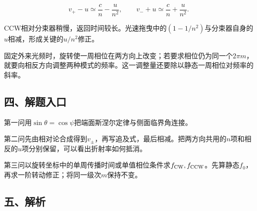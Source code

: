 \documentclass[12pt,a4paper,fontset=fandol]{ctexart}
\begin{document}
\[
v_+-u\simeq\frac cn-\frac{u}{n^2},
\qquad
v_-+u\simeq\frac cn+\frac{u}{n^2}.
\]

CCW相对分束器稍慢，返回时间较长。光速拖曳中的\((1-1/n^2)\)与分束器自身的\(u\)相减，形成关键的\(u/n^2\)修正。

\begin{center}
\begin{minipage}{\linewidth}
\centering\begingroup{}
\ifdim\wd\diagrambox>.88\linewidth
\sbox{\diagrambox}{\resizebox{.88\linewidth}{!}{\usebox{\diagrambox}}}\fi
\ifdim\ht\diagrambox>.38\textheight
\resizebox{!}{.38\textheight}{\usebox{\diagrambox}}
\else\usebox{\diagrambox}\fi
\par{}\endgroup\end{minipage}\end{center}

固定外来光频时，旋转使一周相位在两方向上改变；若要求相位仍为同一个\(2\pi m\)，就要向相反方向调整两种模式的频率。这一调整量还要除以静态一周相位对频率的斜率。

\subsection{四、解题入口}\label{ux56dbux89e3ux9898ux5165ux53e3-5}

第一问用\(\sin\theta=\cos\psi\)把端面斯涅尔定律与侧面临界角连接。

第二问先由相对论合成得到\(v_\pm\)，再写追及式，最后相减。把两方向共用的\(n\)项和相反的\(u\)项分别保留，可以看出折射率如何抵消。

第三问以旋转坐标中的单周传播时间或单值相位条件求\(f_{\rm CW},f_{\rm CCW}\)。先算静态\(f_0\)，再求一阶转动修正；将同一级次\(m\)保持不变。

\subsection{五、解析}\label{ux4e94ux89e3ux6790-5}
\end{document}
